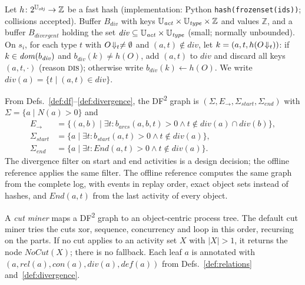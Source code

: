 \begin{definition}\label{def:divergence}
Let $h \colon 2^{\mathbb{U}_{\mathit{obj}}} \to \mathbb{Z}$ be a fast hash
(implementation: Python \texttt{hash(frozenset(ids))}; collisions accepted).
Buffer $B_{\mathit{div}}$ with keys $\mathbb{U}_{\mathit{act}} \times \mathbb{U}_{\mathit{type}} \times \mathbb{Z}$ and
values $\mathbb{Z}$, and a buffer $B_{\mathit{divergent}}$ holding the set
$\mathit{div} \subseteq \mathbb{U}_{\mathit{act}} \times \mathbb{U}_{\mathit{type}}$ (small; normally unbounded). On $s_i$, for each type $t$ with
$O\!\Downarrow_{t} \ne \emptyset$ and $(a,t) \notin \mathit{div}$, let
$k = (a, t, h(O\!\Downarrow_{t}))$:
if $k \in \mathit{dom}(b_{\mathit{div}})$ and $b_{\mathit{div}}(k) \ne h(O)$, add
$(a,t)$ to $\mathit{div}$ and discard all keys $(a, t, \cdot)$ (reason $\textsc{dis}$);
otherwise write $b_{\mathit{div}}(k) \leftarrow h(O)$.
We write $\mathit{div}(a) = \{t \mid (a,t) \in \mathit{div}\}$.
\end{definition}

\begin{definition}\label{def:df2}
From Defs.~\ref{def:df}--\ref{def:divergence}, the DF\textsuperscript{2} graph
is $(\Sigma, E_\to, \Sigma_{\mathit{start}}, \Sigma_{\mathit{end}})$ with
$\Sigma = \{a \mid N(a) > 0\}$ and
\begin{align*}
  E_\to &= \{(a,b) \mid \exists t \colon b_{\mathit{arcs}}(a,b,t) > 0 \wedge t \notin \mathit{div}(a) \cap \mathit{div}(b)\},\\
  \Sigma_{\mathit{start}} &= \{a \mid \exists t \colon b_{\mathit{start}}(a,t) > 0 \wedge t \notin \mathit{div}(a)\},\\
  \Sigma_{\mathit{end}} &= \{a \mid \exists t \colon \mathit{End}(a,t) > 0 \wedge t \notin \mathit{div}(a)\}.
\end{align*}
The divergence filter on start and end activities is a design decision; the
offline reference applies the same filter.
The offline reference computes the same graph from the complete log, with
events in replay order, exact object sets instead of hashes, and
$\mathit{End}(a,t)$ from the last activity of every object.
\end{definition}

\begin{definition}\label{def:ocpt}
A \emph{cut miner} maps a DF\textsuperscript{2} graph to an object-centric
process tree. The default cut miner tries the cuts xor, sequence,
concurrency and loop in this order, recursing on the parts. If no cut applies
to an activity set $X$ with $|X| > 1$, it returns the node
$\mathit{NoCut}(X)$; there is no fallback. Each leaf $a$ is annotated with
$(a, \mathit{rel}(a), \mathit{con}(a), \mathit{div}(a), \mathit{def}(a))$
from Defs.~\ref{def:relations} and~\ref{def:divergence}.
\end{definition}

